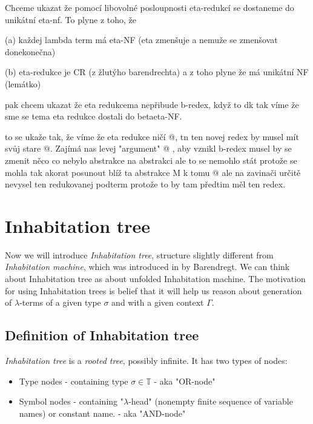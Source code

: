 \documentclass[12pt,a4paper]{report}
\newcommand{\lterms}{$\lambda$-terms\xspace}
\begin{document}
Chceme ukazat že pomocí libovolné posloupnosti eta-redukcí se dostaneme do
unikátní eta-nf. To plyne z toho, že 

 (a) každej lambda term má eta-NF (eta zmenšuje a nemuže se zmenšovat donekonečna)

 (b) eta-redukce je CR (z žlutýho barendrechta) a z toho plyne že má unikátní NF (lemátko)

pak chcem ukazat že eta redukcema nepřibude b-redex, když to dk
tak víme že sme se tema eta redukce dostali do betaeta-NF. 

to se ukaže tak, že víme že eta redukce ničí @, tn ten novej redex by musel
mít svůj stare @. Zajímá nas levej "argument" @ , aby vznikl b-redex
musel by se zmenit něco co nebylo abstrakce na abstrakci ale to se nemohlo stát
protože se mohla tak akorat posunout blíž ta abstrakce M k tomu @
ale na zavinači určitě nevysel ten redukovanej podterm protože to by tam předtim měl ten redex.



\newpage
\section{Inhabitation tree}

Now we will introduce \textit{Inhabitation tree}, structure slightly different from
\textit{Inhabitation machine}, which was introduced in \cite{barendregt10} by Barendregt.
We can think about Inhabitation tree as about unfolded Inhabitation machine.
The motivation for using Inhabitation trees is belief that it will help us 
reason about generation of \lterms 
of a given type $\sigma$ and with a given context $\Gamma$.  

\subsection{Definition of Inhabitation tree}

\textit{Inhabitation tree} is a \textit{rooted tree}, possibly infinite. 
It has two types of nodes:

\begin{samepage}
\begin{itemize}
  \item Type nodes   
  			- containing type $\sigma \in \mathbb{T}$ 
  			- aka "OR-node" %
  \item Symbol nodes 
  			- containing "$\lambda$-head" (nonempty finite sequence of variable names) or constant
  			  name. 
  			- aka "AND-node" %
\end{itemize}
\end{samepage}
\end{document}
